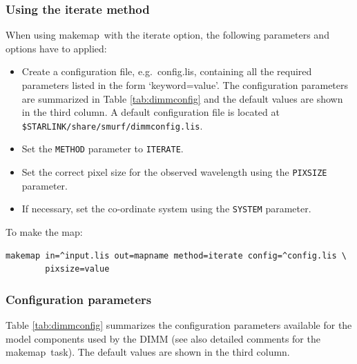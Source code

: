 \documentclass[twoside,11pt]{article}
\newcommand{\xref}[3]{#1}
\renewcommand{\_}{\texttt{\symbol{95}}}
\newcommand{\task}[1]{\textsf{#1}}
\newcommand{\makemap}{\xref{\task{makemap}}{sun258}{MAKEMAP}}
\newcommand{\aparam}[1]{\texttt{#1}}     %
\begin{document}
\subsubsection{Using the iterate method}

When using \makemap\ with the iterate option, the following parameters
and options have to applied:

\begin{itemize}
\item Create a configuration file, e.g.\ config.lis, containing all the
  required parameters listed in the form `keyword=value'. The
  configuration parameters are summarized in Table \ref{tab:dimmconfig}
  and the default values are shown in the third column. A default
  configuration file is located at
  \texttt{\$STARLINK/share/smurf/dimmconfig.lis}.
\item Set the \aparam{METHOD} parameter to \aparam{ITERATE}.
\item Set the correct pixel size for the observed wavelength using the
  \aparam{PIXSIZE} parameter.
\item If necessary, set the co-ordinate system using the \aparam{SYSTEM}
  parameter.
\end{itemize}

To make the map:
\begin{verbatim}
makemap in=^input.lis out=mapname method=iterate config=^config.lis \
        pixsize=value
\end{verbatim}


\subsubsection{Configuration parameters}

Table \ref{tab:dimmconfig} summarizes the configuration parameters
available for the model components used by the DIMM (see also detailed
comments for the \makemap\ task). The default values are shown in the
third column.
\end{document}
